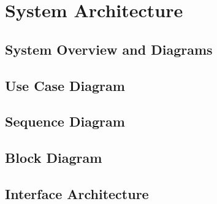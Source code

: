 \chapter{System Architecture}

\section{System Overview and Diagrams}

\section{Use Case Diagram}

\section{Sequence Diagram}

\section{Block Diagram}

\section{Interface Architecture}
